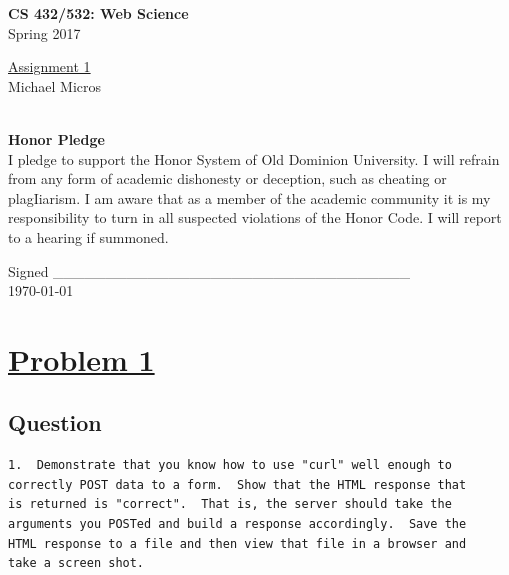 \documentclass{article}
\begin{document}

\begin{titlepage}

\vspace*{45 pt}
\begin{center}
\Huge{\bf CS 432/532:  Web Science}\\
\huge{Spring 2017\\}

\vspace{60 pt}
\Huge\underline {Assignment 1}\\

\vspace{10 pt}
\Huge{Michael Micros}\\\

\vspace{200 pt}
{\huge \bf {Honor Pledge}}\\
\Large{I pledge to support the Honor System of Old Dominion University. I will refrain from any form of academic dishonesty or deception, such as cheating or plagIiarism. I am aware that as a member of the academic community it is my responsibility to turn in all suspected violations of the Honor Code. I will report to a hearing if summoned. }\\
\vspace {.5cm}

{Signed \_\_\_\_\_\_\_\_\_\_\_\_\_\_\_\_\_\_\_\_\_\_\_\_\_\_\_\_\_\_\_\_\_\_}\\
\today

\end{center}
\end{titlepage}





\section*{\underline{Problem 1}}

\subsection*{Question}

\begin{verbatim}
1.  Demonstrate that you know how to use "curl" well enough to
correctly POST data to a form.  Show that the HTML response that
is returned is "correct".  That is, the server should take the
arguments you POSTed and build a response accordingly.  Save the
HTML response to a file and then view that file in a browser and
take a screen shot.

\end{verbatim}
\end{document}
